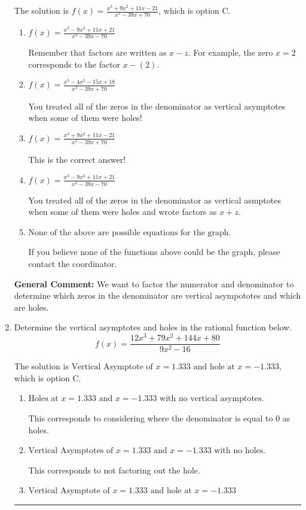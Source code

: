 \documentclass{extbook}[14pt]
\newcommand{\litem}[1]{\item #1

\rule{\textwidth}{0.4pt}}
\begin{document}
\begin{enumerate}
{The solution is \( f(x)=\frac{x^{3} +9 x^{2} +11 x -21}{x^{3} -39 x + 70} \), which is option C.\begin{enumerate}[label=\Alph*.]
\item \( f(x)=\frac{x^{3} -9 x^{2} +11 x + 21}{x^{3} -39 x -70} \)

Remember that factors are written as $x-z$. For example, the zero $x=2$ corresponds to the factor $x-(2)$.
\item \( f(x)=\frac{x^{3} -4 x^{2} -15 x + 18}{x^{3} -39 x + 70} \)

You treated all of the zeros in the denominator as vertical asymptotes when some of them were holes!
\item \( f(x)=\frac{x^{3} +9 x^{2} +11 x -21}{x^{3} -39 x + 70} \)

This is the correct answer!
\item \( f(x)=\frac{x^{3} -9 x^{2} +11 x + 21}{x^{3} -39 x -70} \)

You treated all of the zeros in the denominator as vertical asmptotes when some of them were holes and wrote factors as $x+z$.
\item \( \text{None of the above are possible equations for the graph.} \)

If you believe none of the functions above could be the graph, please contact the coordinator.
\end{enumerate}

\textbf{General Comment:} We want to factor the numerator and denominator to determine which zeros in the denominator are vertical asympototes and which are holes.
}
\litem{
Determine the vertical asymptotes and holes in the rational function below.
\[ f(x) = \frac{12x^{3} +79 x^{2} +144 x + 80}{9x^{2} -16} \]

The solution is \( \text{Vertical Asymptote of } x = 1.333 \text{ and hole at } x = -1.333 \), which is option C.\begin{enumerate}[label=\Alph*.]
\item \( \text{Holes at } x = 1.333 \text{ and } x = -1.333 \text{ with no vertical asymptotes.} \)

This corresponds to considering where the denominator is equal to 0 as holes.
\item \( \text{Vertical Asymptotes of } x = 1.333 \text{ and } x = -1.333 \text{ with no holes.} \)

This corresponds to not factoring out the hole.
\item \( \text{Vertical Asymptote of } x = 1.333 \text{ and hole at } x = -1.333 \)


\end{enumerate}}
\end{enumerate}
\end{document}
